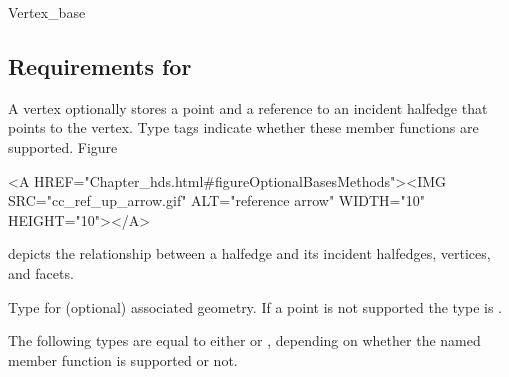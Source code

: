 \def\ccTagRmConstRefPair{\ccFalse}
\def\ccTagRmEigenClassName{\ccFalse}
\def\ccTagRmTrailingConst{\ccFalse}

\begin{ccClass}{Vertex_base}
\subsection{Requirements for \protect{}}
\label{sectionHdsVertexBase}
\ccThreeToTwo


\ccDefinition

A vertex optionally stores a point and a reference to an incident
halfedge that points to the vertex. Type tags indicate whether these
member functions are supported. 
Figure~\ccTexHtml{\ref{figureOptionalBasesMethods}}{}\begin{ccHtmlOnly}
  <A HREF="Chapter_hds.html#figureOptionalBasesMethods"><IMG 
  SRC="cc_ref_up_arrow.gif" ALT="reference arrow" WIDTH="10" HEIGHT="10"></A>
\end{ccHtmlOnly}
depicts the relationship between a halfedge and its incident halfedges,
vertices, and facets.


\ccTypes

Type for (optional) associated geometry. If a
point is not supported the type is .



\ccCreation

\ccGlue
{}
\ccGlue
{}

\ccOperations

\ccGlue
{}
\ccGlue
{}
\ccGlue
{}




The following types are equal to either  or
, depending on whether the named member function is
supported or not.

\ccGlue
{}

\end{ccClass}

